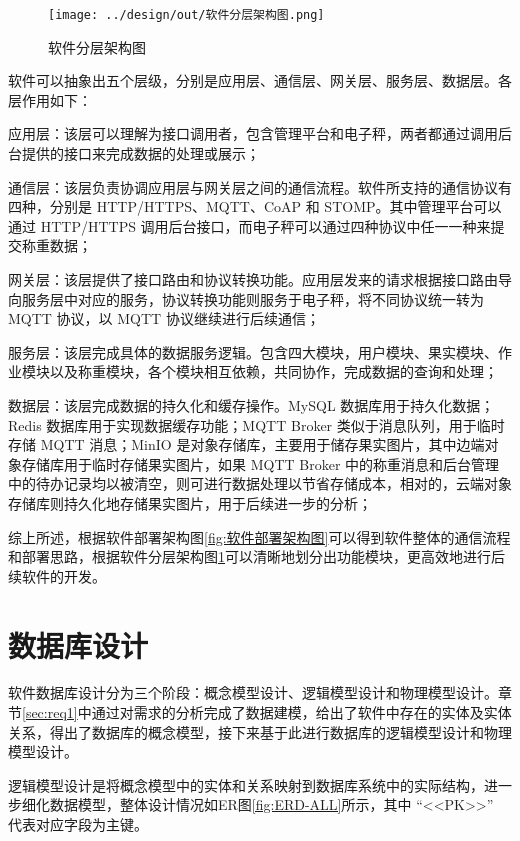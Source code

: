 \begin{figure}
    \centering
    \texttt{[image: ../design/out/软件分层架构图.png]}
    \caption{软件分层架构图}
    \label{fig:软件分层架构图}
\end{figure}

软件可以抽象出五个层级，分别是应用层、通信层、网关层、服务层、数据层。各层作用如下：

应用层：该层可以理解为接口调用者，包含管理平台和电子秤，两者都通过调用后台提供的接口来完成数据的处理或展示；

通信层：该层负责协调应用层与网关层之间的通信流程。软件所支持的通信协议有四种，分别是 HTTP/HTTPS、MQTT、CoAP 和 STOMP。其中管理平台可以通过 HTTP/HTTPS 调用后台接口，而电子秤可以通过四种协议中任一一种来提交称重数据；

网关层：该层提供了接口路由和协议转换功能。应用层发来的请求根据接口路由导向服务层中对应的服务，协议转换功能则服务于电子秤，将不同协议统一转为 MQTT 协议，以 MQTT 协议继续进行后续通信；

服务层：该层完成具体的数据服务逻辑。包含四大模块，用户模块、果实模块、作业模块以及称重模块，各个模块相互依赖，共同协作，完成数据的查询和处理；

数据层：该层完成数据的持久化和缓存操作。MySQL 数据库用于持久化数据；Redis 数据库用于实现数据缓存功能；MQTT Broker 类似于消息队列，用于临时存储 MQTT 消息；MinIO 是对象存储库，主要用于储存果实图片，其中边端对象存储库用于临时存储果实图片，如果 MQTT Broker 中的称重消息和后台管理中的待办记录均以被清空，则可进行数据处理以节省存储成本，相对的，云端对象存储库则持久化地存储果实图片，用于后续进一步的分析；

综上所述，根据软件部署架构图\ref{fig:软件部署架构图}可以得到软件整体的通信流程和部署思路，根据软件分层架构图\ref{fig:软件分层架构图}可以清晰地划分出功能模块，更高效地进行后续软件的开发。

\section{数据库设计}\label{sec:database}

软件数据库设计分为三个阶段：概念模型设计、逻辑模型设计和物理模型设计\cite{苗雪兰2001数据库系统原理及应用教程}。章节\ref{sec:req1}中通过对需求的分析完成了数据建模，给出了软件中存在的实体及实体关系，得出了数据库的概念模型，接下来基于此进行数据库的逻辑模型设计和物理模型设计。

逻辑模型设计是将概念模型中的实体和关系映射到数据库系统中的实际结构\cite{苗雪兰2001数据库系统原理及应用教程}，进一步细化数据模型，整体设计情况如ER图\ref{fig:ERD-ALL}所示，其中 “<<PK>>” 代表对应字段为主键。

